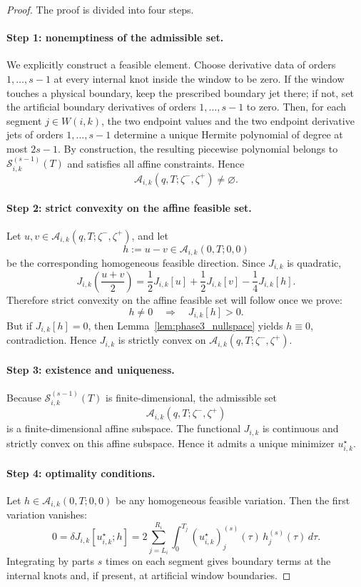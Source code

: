 \begin{proof}
The proof is divided into four steps.

\paragraph{Step 1: nonemptiness of the admissible set.}
We explicitly construct a feasible element.
Choose derivative data of orders \(1,\dots,s-1\) at every internal knot inside the window to be zero.
If the window touches a physical boundary, keep the prescribed boundary jet there; if not, set the artificial boundary derivatives of orders \(1,\dots,s-1\) to zero.
Then, for each segment \(j\in W(i,k)\), the two endpoint values and the two endpoint derivative jets of orders \(1,\dots,s-1\) determine a unique Hermite polynomial of degree at most \(2s-1\).
By construction, the resulting piecewise polynomial belongs to \(\mathcal S_{i,k}^{(s-1)}(T)\) and satisfies all affine constraints.
Hence
\[
\mathcal A_{i,k}(q,T;\zeta^-,\zeta^+)\neq\varnothing.
\]

\paragraph{Step 2: strict convexity on the affine feasible set.}
Let \(u,v\in \mathcal A_{i,k}(q,T;\zeta^-,\zeta^+)\), and let
\[
h:=u-v\in \mathcal A_{i,k}(0,T;0,0)
\]
be the corresponding homogeneous feasible direction.
Since \(J_{i,k}\) is quadratic,
\[
J_{i,k}\!\left(\frac{u+v}{2}\right)
=
\frac{1}{2}J_{i,k}[u]+\frac{1}{2}J_{i,k}[v]-\frac{1}{4}J_{i,k}[h].
\]
Therefore strict convexity on the affine feasible set will follow once we prove:
\[
h\neq 0 \quad\Longrightarrow\quad J_{i,k}[h]>0.
\]
But if \(J_{i,k}[h]=0\), then Lemma~\ref{lem:phase3_nullspace} yields \(h\equiv 0\), contradiction.
Hence \(J_{i,k}\) is strictly convex on \(\mathcal A_{i,k}(q,T;\zeta^-,\zeta^+)\).

\paragraph{Step 3: existence and uniqueness.}
Because \(\mathcal S_{i,k}^{(s-1)}(T)\) is finite-dimensional, the admissible set
\[
\mathcal A_{i,k}(q,T;\zeta^-,\zeta^+)
\]
is a finite-dimensional affine subspace.
The functional \(J_{i,k}\) is continuous and strictly convex on this affine subspace.
Hence it admits a unique minimizer \(u_{i,k}^\star\).

\paragraph{Step 4: optimality conditions.}
Let \(h\in \mathcal A_{i,k}(0,T;0,0)\) be any homogeneous feasible variation.
Then the first variation vanishes:
\[
0
=
\delta J_{i,k}[u_{i,k}^\star;h]
=
2\sum_{j=L_i}^{R_i}\int_{0}^{T_j}
(u_{i,k}^\star)_j^{(s)}(\tau)\,h_j^{(s)}(\tau)\,d\tau.
\]
Integrating by parts \(s\) times on each segment gives boundary terms at the internal knots and, if present, at artificial window boundaries.


\end{proof}
